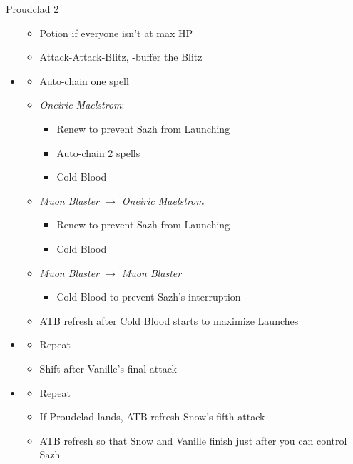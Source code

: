 \begin{paracol}{2}
\begin{battle}{Proudclad 2}
\begin{itemize}
\begin{itemize}
			      \item Potion if everyone isn't at max HP
			      \item Attack-Attack-Blitz, \rav-buffer the Blitz
		      \end{itemize}
		\item \third
		      \begin{itemize}
			      \item Auto-chain one spell
			      \item \textit{Oneiric Maelstrom}:
			            \begin{itemize}
				            \item Renew to prevent Sazh from Launching
				            \item Auto-chain 2 spells
				            \item Cold Blood
			            \end{itemize}
			      \item \textit{Muon Blaster $\rightarrow$ Oneiric Maelstrom}
			            \begin{itemize}
				            \item Renew to prevent Sazh from Launching
				            \item Cold Blood
			            \end{itemize}
			      \item \textit{Muon Blaster $\rightarrow$ Muon Blaster}
			            \begin{itemize}
				            \item Cold Blood to prevent Sazh's interruption
			            \end{itemize}
			      \item ATB refresh after Cold Blood starts to maximize Launches
		      \end{itemize}
		\item \fifth
		      \begin{itemize}
			      \item Repeat
			      \item Shift after Vanille's final attack
		      \end{itemize}
		\item \first
		      \begin{itemize}
			      \item Repeat
			      \item If Proudclad lands, ATB refresh Snow's fifth attack
			      \item ATB refresh so that Snow and Vanille finish just after you can control Sazh

\end{itemize}
\end{itemize}
\end{battle}
\end{paracol}
